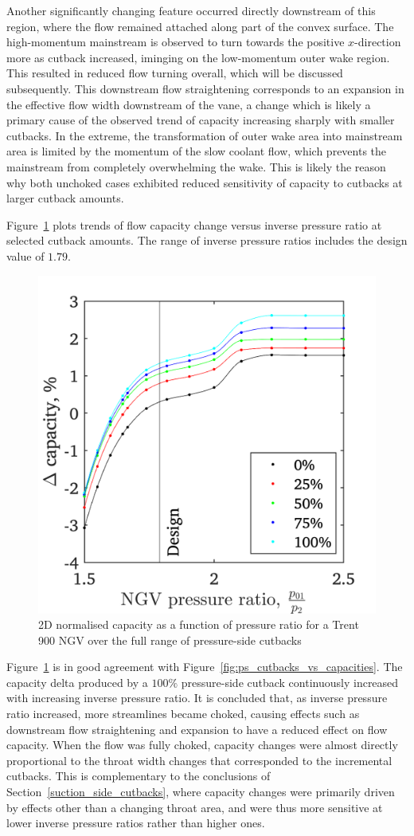 \documentclass[a4paper, 11pt, oneside]{report}
\begin{document}
Another significantly changing feature occurred directly downstream of this region, where the flow remained attached along part of the convex surface. The high-momentum mainstream is observed to turn towards the positive $x$-direction more as cutback increased, iminging on the low-momentum outer wake region. This resulted in reduced flow turning overall, which will be discussed subsequently. This downstream flow straightening corresponds to an expansion in the effective flow width downstream of the vane, a change which is likely a primary cause of the observed trend of capacity increasing sharply with smaller cutbacks. In the extreme, the transformation of outer wake area into mainstream area is limited by the momentum of the slow coolant flow, which prevents the mainstream from completely overwhelming the wake. This is likely the reason why both unchoked cases exhibited reduced sensitivity of capacity to cutbacks at larger cutback amounts.

Figure~\ref{fig:ps_cutbacks_capacities_trends} plots trends of flow capacity change versus inverse pressure ratio at selected cutback amounts. The range of inverse pressure ratios includes the design value of $1.79$.

\begin{figure}[H]
	\centering
	\includegraphics[width=.45\textwidth]{figs/ps_cutbacks_capacities_trends.png}
	\caption{2D normalised capacity as a function of pressure ratio for a Trent 900 NGV over the full range of pressure-side cutbacks}
    \label{fig:ps_cutbacks_capacities_trends}
\end{figure}

Figure~\ref{fig:ps_cutbacks_capacities_trends} is in good agreement with Figure~\ref{fig:ps_cutbacks_vs_capacities}. The capacity delta produced by a $100\%$ pressure-side cutback continuously increased with increasing inverse pressure ratio. It is concluded that, as inverse pressure ratio increased, more streamlines became choked, causing effects such as downstream flow straightening and expansion to have a reduced effect on flow capacity. When the flow was fully choked, capacity changes were almost directly proportional to the throat width changes that corresponded to the incremental cutbacks. This is complementary to the conclusions of Section~\ref{suction_side_cutbacks}, where capacity changes were primarily driven by effects other than a changing throat area, and were thus more sensitive at lower inverse pressure ratios rather than higher ones. 
\end{document}
